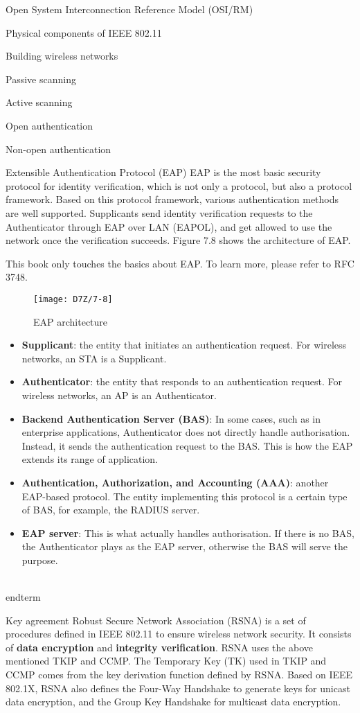 \documentclass[a4paper,12pt]{book}
\begin{document}
\begin{term}{Open System Interconnection Reference Model (OSI/RM)}
\begin{term}{Physical components of IEEE 802.11}
\begin{term}{Building wireless networks}
\begin{term}{Passive scanning}
\begin{term}{Active scanning}
\begin{term}{Open authentication}
\begin{term}{Non-open authentication}
\begin{term}{Extensible Authentication Protocol (EAP)}
    EAP is the most basic security protocol for identity verification, which is not only a protocol, but also a protocol framework. Based on this protocol framework, various authentication methods are well supported. Supplicants send identity verification requests to the Authenticator through EAP over LAN (EAPOL), and get allowed to use the network once the verification succeeds. Figure 7.8 shows the architecture of EAP.
    
    \parskip 6pt
    This book only touches the basics about EAP. To learn more, please refer to RFC 3748.

    \begin{figure}[!h]
        \centering
        \texttt{[image: D7Z/7-8]}
        \caption{EAP architecture}
    \end{figure}

    \begin{itemize}
        \item \textbf{Supplicant}: the entity that initiates an authentication request. For wireless networks, an STA is a Supplicant.
        \item \textbf{Authenticator}: the entity that responds to an authentication request. For wireless networks, an AP is an Authenticator.
        \item \textbf{Backend Authentication Server (BAS)}: In some cases, such as in enterprise applications, Authenticator does not directly handle authorisation. Instead, it sends the authentication request to the BAS. This is how the EAP extends its range of application.
        \item \textbf{Authentication, Authorization, and Accounting (AAA)}: another EAP-based protocol. The entity implementing this protocol is a certain type of BAS, for example, the RADIUS server.
        \item \textbf{EAP server}: This is what actually handles authorisation. If there is no BAS, the Authenticator plays as the EAP server, otherwise the BAS will serve the purpose.
    \end{itemize}
\\end{term}{}

\begin{term}{Key agreement}
    Robust Secure Network Association (RSNA) is a set of procedures defined in IEEE 802.11 to ensure wireless network security. It consists of \textbf{data encryption} and \textbf{integrity verification}. RSNA uses the above mentioned TKIP and CCMP. The Temporary Key (TK) used in TKIP and CCMP comes from the key derivation function defined by RSNA. Based on IEEE 802.1X, RSNA also defines the Four-Way Handshake to generate keys for unicast data encryption, and the Group Key Handshake for multicast data encryption.


\end{term}
\end{term}
\end{term}
\end{term}
\end{term}
\end{term}
\end{term}
\end{term}
\end{term}
\end{document}
